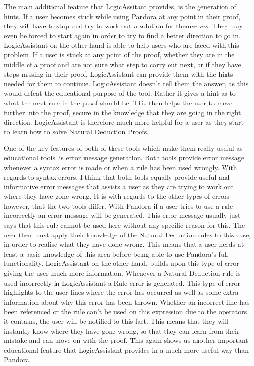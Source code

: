 The main additional feature that LogicAssitant provides, is the generation of hints. If a user becomes stuck while using Pandora at any point in their proof, they will have to stop and try to work out a solution for themselves. They may even be forced to start again in order to try to find a better direction to go in. LogicAssistant on the other hand is able to help users who are faced with this problem. If a user is stuck at any point of the proof, whether they are in the middle of a proof and are not sure what step to carry out next, or if they have steps missing in their proof, LogicAssistant can provide them with the hints needed for them to continue. LogicAssistant doesn't tell them the answer, as this would defeat the educational purpose of the tool. Rather it gives a hint as to what the next rule in the proof should be. This then helps the user to move further into the proof, secure in the knowledge that they are going in the right direction. LogicAssistant is therefore much more helpful for a user as they start to learn how to solve Natural Deduction Proofs.

One of the key features of both of these tools which make them really useful as educational tools, is error message generation. Both tools provide error message whenever a syntax error is made or when a rule has been used wrongly. With regards to syntax errors, I think that both tools equally provide useful and informative error messages that assists a user as they are trying to work out where they have gone wrong. It is with regards to the other types of errors however, that the two tools differ. With Pandora if a user tries to use a rule incorrectly an error message will be generated. This error message usually just says that this rule cannot be used here without any specific reason for this. The user then must apply their knowledge of the Natural Deduction rules to this case, in order to realise what they have done wrong. This means that a user needs at least a basic knowledge of this area before being able to use Pandora's full functionality. LogicAssistant on the other hand, builds upon this type of error giving the user much more information. Whenever a Natural Deduction rule is used incorrectly in LogicAssistant a Rule error is generated. This type of error highlights to the user lines where the error has occurred as well as some extra information about why this error has been thrown. Whether an incorrect line has been referenced or the rule can't be used on this expression due to the operators it contains, the user will be notified to this fact. This means that they will instantly know where they have gone wrong, so that they can learn from their mistake and can move on with the proof. This again shows us another important educational feature that LogicAssistant provides in a much more useful way than Pandora.

